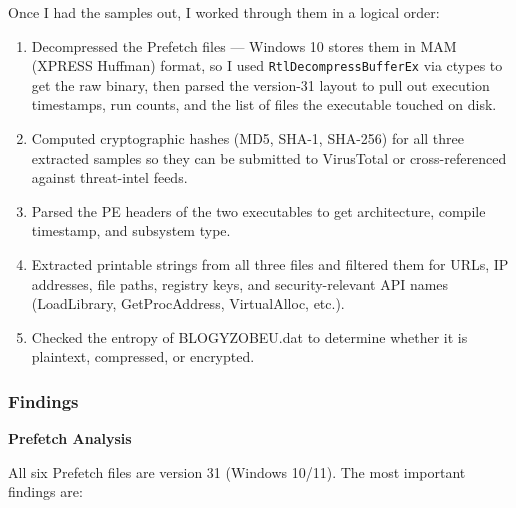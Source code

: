 \documentclass[
]{article}
\begin{document}
Once I had the samples out, I worked through them in a logical order:

\begin{enumerate}
\def\labelenumi{\arabic{enumi}.}
\item
  Decompressed the Prefetch files --- Windows 10 stores them in MAM
  (XPRESS Huffman) format, so I used \texttt{RtlDecompressBufferEx} via
  ctypes to get the raw binary, then parsed the version-31 layout to
  pull out execution timestamps, run counts, and the list of files the
  executable touched on disk.
\item
  Computed cryptographic hashes (MD5, SHA-1, SHA-256) for all three
  extracted samples so they can be submitted to VirusTotal or
  cross-referenced against threat-intel feeds.
\item
  Parsed the PE headers of the two executables to get architecture,
  compile timestamp, and subsystem type.
\item
  Extracted printable strings from all three files and filtered them for
  URLs, IP addresses, file paths, registry keys, and security-relevant
  API names (LoadLibrary, GetProcAddress, VirtualAlloc, etc.).
\item
  Checked the entropy of BLOGYZOBEU.dat to determine whether it is
  plaintext, compressed, or encrypted.
\end{enumerate}

\subsubsection{Findings}\label{findings}

\textbf{Prefetch Analysis}

All six Prefetch files are version 31 (Windows 10/11). The most
important findings are:
\end{document}
